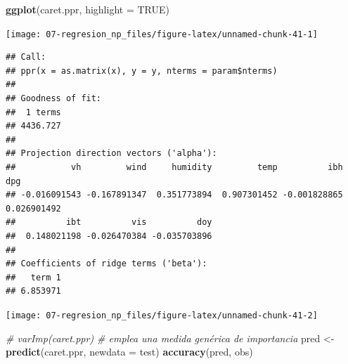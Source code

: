 \documentclass[
  spanish,
]{book}
\newenvironment{Shaded}{\begin{snugshade}}{\end{snugshade}}
\newcommand{\CommentTok}[1]{\textcolor[rgb]{0.56,0.35,0.01}{\textit{#1}}}
\newcommand{\DataTypeTok}[1]{\textcolor[rgb]{0.13,0.29,0.53}{#1}}
\newcommand{\KeywordTok}[1]{\textcolor[rgb]{0.13,0.29,0.53}{\textbf{#1}}}
\newcommand{\NormalTok}[1]{#1}
\newcommand{\OperatorTok}[1]{\textcolor[rgb]{0.81,0.36,0.00}{\textbf{#1}}}
\newcommand{\OtherTok}[1]{\textcolor[rgb]{0.56,0.35,0.01}{#1}}
\newcommand{\StringTok}[1]{\textcolor[rgb]{0.31,0.60,0.02}{#1}}
\theoremstyle{break}
\theoremstyle{definition}
\theoremstyle{definition}
\theoremstyle{definition}
\theoremstyle{remark}
\begin{document}
\begin{Shaded}
\begin{Highlighting}[]
\KeywordTok{ggplot}\NormalTok{(caret.ppr, }\DataTypeTok{highlight =} \OtherTok{TRUE}\NormalTok{)}
\end{Highlighting}
\end{Shaded}

\begin{center}\texttt{[image: 07-regresion\_np\_files/figure-latex/unnamed-chunk-41-1]} \end{center}

\begin{Shaded}
\end{Shaded}

\begin{verbatim}
## Call:
## ppr(x = as.matrix(x), y = y, nterms = param$nterms)
## 
## Goodness of fit:
##  1 terms 
## 4436.727 
## 
## Projection direction vectors ('alpha'):
##           vh         wind     humidity         temp          ibh          dpg 
## -0.016091543 -0.167891347  0.351773894  0.907301452 -0.001828865  0.026901492 
##          ibt          vis          doy 
##  0.148021198 -0.026470384 -0.035703896 
## 
## Coefficients of ridge terms ('beta'):
##   term 1 
## 6.853971
\end{verbatim}

\begin{Shaded}
\end{Shaded}

\begin{center}\texttt{[image: 07-regresion\_np\_files/figure-latex/unnamed-chunk-41-2]} \end{center}

\begin{Shaded}
\begin{Highlighting}[]
\CommentTok{# varImp(caret.ppr) # emplea una medida genérica de importancia}
\NormalTok{pred <-}\StringTok{ }\KeywordTok{predict}\NormalTok{(caret.ppr, }\DataTypeTok{newdata =}\NormalTok{ test)}
\KeywordTok{accuracy}\NormalTok{(pred, obs)}
\end{Highlighting}
\end{Shaded}
\end{document}
